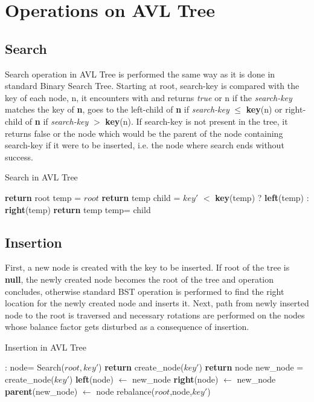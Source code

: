\documentclass[MTech]{iitmdiss}
\begin{document}
\section{Operations on AVL Tree}
\subsection{Search}
Search operation in AVL Tree is performed the same way as it is done in standard Binary Search Tree. Starting at root, search-key is compared with the key of each node, n, it encounters with and returns \textit{true} or n if the  \textit{search-key} matches the key of \textbf{n}, goes to the left-child of \textbf{n} if \textit{search-key} $\leq$ \textbf{key}(n) or right-child of \textbf{n} if \textit{search-key} $>$ \textbf{key}(n). If search-key is not present in the tree, it returns false or the node which would be the parent of the node containing search-key if it were to be inserted, i.e. the node where search ends without success.

\begin{algorithm}
\caption{Search in AVL Tree}
\begin{algorithmic}[1]
\State \textbf{return} root
\EndIf
\State temp = $root$
 \State \textbf{return} temp
 \EndIf
 \State child = $key'$ $<$ \textbf{key}(temp) ? \textbf{left}(temp) : \textbf{right}(temp)
 \State \textbf{return} temp
 \EndIf
 \State temp= child
 \EndWhile
 \EndFunction
\end{algorithmic}
\end{algorithm}


\subsection{Insertion}
First, a new node is created with the key to be inserted. If root of the tree is \textbf{null}, the  newly created node becomes the root of the tree and operation concludes, otherwise standard BST operation is performed to find the right location for the newly created node and inserts it. Next, path from newly inserted node to the root is traversed and necessary rotations are performed on the nodes whose balance factor gets disturbed as a consequence of insertion. 

\begin{algorithm}
\caption{Insertion in AVL Tree}
\begin{algorithmic}[1]
:
\State node= Search($root, key'$)
    \State \textbf{return} create\_node($key'$)
    \State \textbf{return} node
\EndIf
\State new\_node = create\_node($key'$)
\State  \textbf{left}(node) $\leftarrow$ new\_node
\Else \State \textbf{right}(node) $\leftarrow$ new\_node
\EndIf
\State \textbf{parent}(new\_node) $\leftarrow$ node
\State rebalance($root$,node,$key'$)
\EndFunction
\end{algorithmic}
\end{algorithm}
\end{document}
